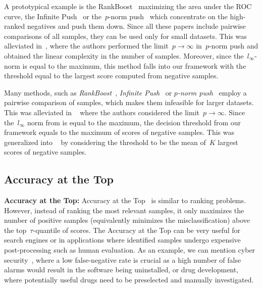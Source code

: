 A prototypical example is the RankBoost~\cite{freund2003efficient} maximizing the area under the ROC curve, the Infinite Push~\cite{agarwal2011infinite} or the~$p$-norm push~\cite{rudin2009pnorm} which concentrate on the high-ranked negatives and push them down. Since all these papers include pairwise comparisons of all samples, they can be used only for small datasets. This was alleviated in~\cite{li2014top}, where the authors performed the limit~$p \to \infty$ in~$p$-norm push and obtained the linear complexity in the number of samples. Moreover, since the~$l_{\infty}$-norm is equal to the maximum, this method falls into our framework with the threshold equal to the largest score computed from negative samples.

Many methods, such as \emph{RankBoost}~\cite{freund2003efficient}, \emph{Infinite Push}~\cite{agarwal2011infinite} or \emph{$p$-norm push}~\cite{rudin2009pnorm} employ a pairwise comparison of samples, which makes them infeasible for larger datasets. This was alleviated in \TopPush~\cite{li2014top} where the authors considered the limit~$p \rightarrow \infty$. Since the~$l_{\infty}$ norm from \TopPush is equal to the maximum, the decision threshold from our framework equals to the maximum of scores of negative samples. This was generalized into \TopPushK~\cite{adam2021general} by considering the threshold to be the mean of~$K$ largest scores of negative samples.

\subsection{Accuracy at the Top}


\textbf{Accuracy at the Top:} Accuracy at the Top~\cite{boyd2012accuracy, grill2016learning} is similar to ranking problems. However, instead of ranking the most relevant samples, it only maximizes the number of positive samples (equivalently minimizes the misclassification)  above the top~$\tau$-quantile of scores. The Accuracy at the Top can be very useful for search engines or in applications where identified samples undergo expensive post-processing such as human evaluation. As an example, we can mention cyber security~\cite{grill2016learning}, where a low false-negative rate is crucial as a high number of false alarms would result in the software being uninstalled, or drug development, where potentially useful drugs need to be preselected and manually investigated.

